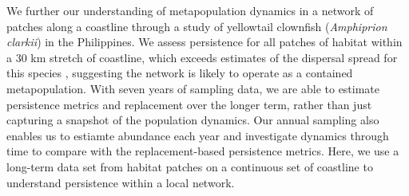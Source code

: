 \documentclass[12pt, oneside]{article}   	%
\begin{document}
We further our understanding of metapopulation dynamics in a network of patches along a coastline through a study of yellowtail clownfish (\textit{Amphiprion clarkii}) in the Philippines. We assess persistence for all patches of habitat within a 30 km stretch of coastline, which exceeds estimates of the dispersal spread for this species \citep{pinsky2010using}, suggesting the network is likely to operate as a contained metapopulation. With seven years of sampling data, we are able to estimate persistence metrics and replacement over the longer term, rather than just capturing a snapshot of the population dynamics. Our annual sampling also enables us to estiamte abundance each year and investigate dynamics through time to compare with the replacement-based persistence metrics. Here, we use a long-term data set from habitat patches on a continuous set of coastline to understand persistence within a local network. %


\end{document}

